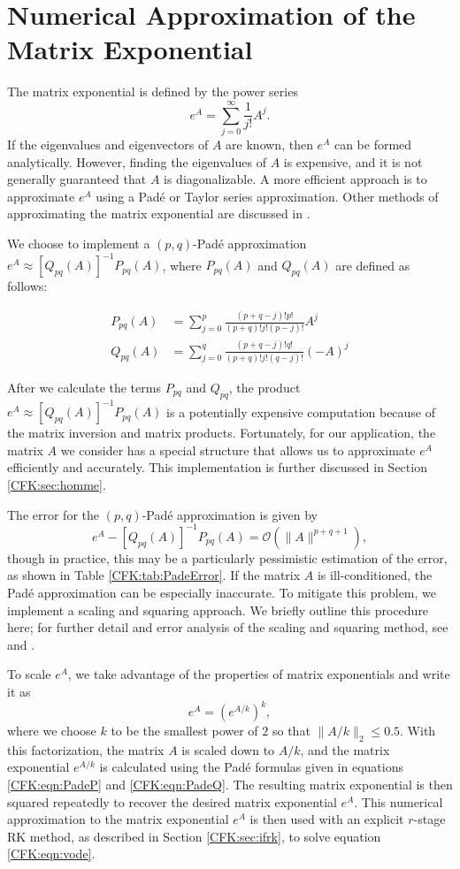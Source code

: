 \documentclass{csri19}
\begin{document}
\section{Numerical Approximation of the Matrix Exponential}
\label{CFK:sec:matexp} 
The matrix exponential is defined by the power series 
\[ e^A = \sum_{j=0}^\infty \frac{1}{j!}A^j.\]
If the eigenvalues and eigenvectors of $A$ are known, then $e^A$ can be 
formed analytically. However, finding the eigenvalues of $A$ is expensive, 
and it is not generally guaranteed that $A$ is diagonalizable. A more 
efficient approach is to approximate $e^{A}$ using a Pad\'e or Taylor 
series approximation. Other methods of approximating the matrix exponential 
are discussed in \cite{CFK:Moler2003}.

We choose to implement a $(p,q)$-Pad\'e approximation 
$e^{A}\approx \left[Q_{pq}(A)\right]^{-1}P_{pq}(A)$, where $P_{pq}(A)$ and 
$Q_{pq}(A)$ are defined as follows:

\begin{align}
\label{CFK:eqn:PadeP}
P_{pq}(A) &= \sum_{j=0}^p\frac{(p+q-j)!p!}{(p+q)!j!(p-j)!}A^j\\
\label{CFK:eqn:PadeQ}
Q_{pq}(A) &= \sum_{j=0}^q\frac{(p+q-j)!q!}{(p+q)!j!(q-j)!}(-A)^j
\end{align}

After we calculate the terms $P_{pq}$ and $Q_{pq}$, the product 
$e^A\approx\left[Q_{pq}(A)\right]^{-1}P_{pq}(A)$ is a potentially expensive 
computation because of the matrix inversion and matrix products. 
Fortunately, for our application, the matrix $A$ we consider has a special 
structure that allows us to approximate $e^A$ efficiently and accurately. 
This implementation is further discussed in Section \ref{CFK:sec:homme}.

The error for the $(p,q)$-Pad\'e approximation is given by
\[e^A-\left[Q_{pq}(A)\right]^{-1}P_{pq}(A) = \mathcal{O}(\|A\|^{p+q+1}),\] 
though in practice, this may be a particularly pessimistic estimation of 
the error, as shown in Table \ref{CFK:tab:PadeError}. If the matrix $A$ is 
ill-conditioned, the Pad\'e  approximation can be especially inaccurate. 
To mitigate this problem, we implement a scaling and squaring approach. We 
briefly outline this procedure here; for further detail and error analysis 
of the scaling and squaring method, see \cite{CFK:Al-Mohy2009} and 
\cite{CFK:higham2005}.


To scale $e^A$, we take advantage of the properties of matrix exponentials 
and write it as
\[e^{A} = \left(e^{A/k}\right)^k,\]
where we choose $k$ to be the smallest power of $2$ so that $\|A/k\|_2
\leq 0.5$. With this factorization, the matrix $A$ is scaled down to $A/k$, 
and the matrix exponential $e^{A/k}$ is calculated using the Pad\'e 
formulas given in equations \ref{CFK:eqn:PadeP} and \ref{CFK:eqn:PadeQ}. 
The resulting matrix exponential is then squared repeatedly to recover the 
desired matrix exponential $e^{A}$. This numerical approximation to the 
matrix exponential $e^A$ is then used with an explicit $r$-stage RK method, 
as described in Section \ref{CFK:sec:ifrk}, to solve equation 
\ref{CFK:eqn:vode}.
\end{document}
